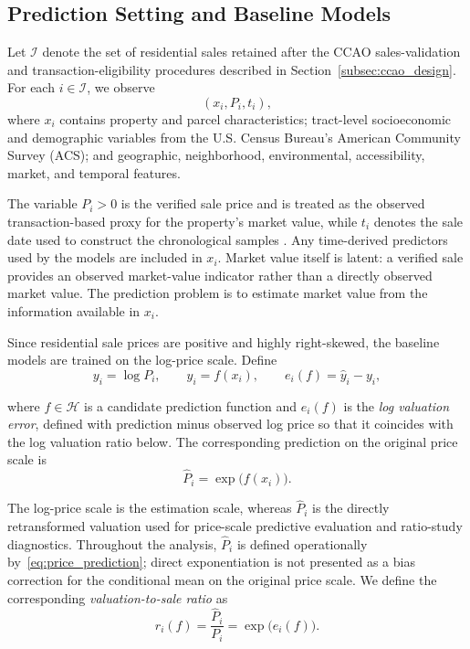 \documentclass[10pt]{article}
\theoremstyle{definition}
\newcommand{\1}{\mathbf{1}}
\begin{document}
\subsection{Prediction Setting and Baseline Models}
\label{subsec:baseline_models}

Let $\mathcal{I}$ denote the set of residential sales retained after the CCAO sales-validation and transaction-eligibility procedures described in Section~\ref{subsec:ccao_design}. For each $i\in\mathcal{I}$, we observe
\[
(x_i,P_i,t_i),
\]
where $x_i$ contains property and parcel characteristics; tract-level socioeconomic and demographic variables from the U.S. Census Bureau's American Community Survey (ACS); and geographic, neighborhood, environmental, accessibility, market, and temporal features.


{The variable $P_i>0$ is the verified sale price and is treated as the observed transaction-based proxy for the property's market value, while $t_i$ denotes the sale date used to construct the chronological samples \cite{CCAOModelResAVM2026,IAAO2026ExposureRatio}. Any time-derived predictors used by the models are included in $x_i$. Market value itself is latent: a verified sale provides an observed market-value indicator rather than a directly observed market value. The prediction problem is to estimate market value from the information available in $x_i$.}

Since residential sale prices are positive and highly right-skewed, the baseline models are trained on the log-price scale. Define
\begin{equation}
\label{eq:prediction_scale}
y_i=\log P_i,
\qquad
\widehat{y}_i=f(x_i),
\qquad
e_i(f)=\widehat{y}_i-y_i,
\end{equation}

{where $f\in\mathcal{H}$ is a candidate prediction function and $e_i(f)$ is the \emph{log valuation error}, defined with prediction minus observed log price so that it coincides with the log valuation ratio below.}
The corresponding prediction on the original price scale is
\begin{equation}
\label{eq:price_prediction}
\widehat{P}_i=\exp\bigl(f(x_i)\bigr).
\end{equation}


{The log-price scale is the estimation scale, whereas $\widehat{P}_i$ is the directly retransformed valuation used for price-scale predictive evaluation and ratio-study diagnostics. Throughout the analysis, $\widehat{P}_i$ is defined operationally by~\eqref{eq:price_prediction}; direct exponentiation is not presented as a bias correction for the conditional mean on the original price scale. We define the corresponding \emph{valuation-to-sale ratio} as}
\begin{equation}
\label{eq:valuation_ratio}
r_i(f)
=
\frac{\widehat{P}_i}{P_i}
=
\exp\bigl(e_i(f)\bigr).
\end{equation}
\end{document}
